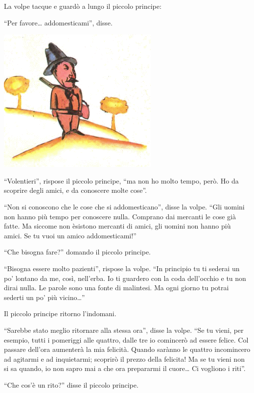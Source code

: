 \documentclass[11pt]{scrbook}
\begin{document}
La volpe tacque e guardò a lungo il piccolo principe:

``Per favore\ldots{} addomesticami'', disse.

\begin{center}
\includegraphics{img/myslivec}
\end{center}

``Volentieri'', rispose il piccolo principe, ``ma non ho molto tempo,
però. Ho da scoprire degli amici, e da conoscere molte cose''.

``Non si conoscono che le cose che si addomesticano'', disse la volpe.
``Gli uomini non hanno più tempo per conoscere nulla. Comprano dai
mercanti le cose già fatte. Ma siccome non èsistono mercanti di amici,
gli uomini non hanno più amici. Se tu vuoi un amico addomesticami!''

``Che bisogna fare?'' domando il piccolo principe.

``Bisogna essere molto pazienti'', rispose la volpe. ``In principio tu
ti sederai un po' lontano da me, così, nell'erba. Io ti guardero con la
coda dell'occhio e tu non dirai nulla. Le parole sono una fonte di
malintesi. Ma ogni giorno tu potrai sederti un po' più vicino\ldots{}''

Il piccolo principe ritorno l'indomani.

``Sarebbe stato meglio ritornare alla stessa ora'', disse la volpe. ``Se tu vieni, per esempio, tutti i pomeriggi alle quattro, dalle tre io comincerò ad essere felice. Col passare dell'ora aumenterà la mia felicità. Quando sarànno le quattro incomincero ad agitarmi e ad inquietarmi; scoprirò il prezzo della felicita! Ma se tu vieni non si sa
quando, io non sapro mai a che ora prepararmi il cuore\ldots{} Ci vogliono i riti''.

``Che cos'è un rito?'' disse il piccolo principe.
\end{document}
